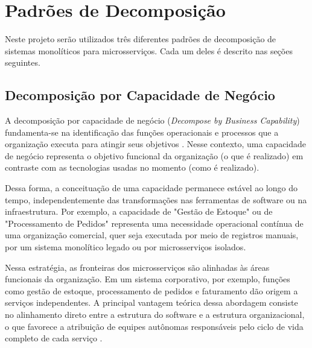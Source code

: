
\section{Padrões de Decomposição}

Neste projeto serão utilizados três diferentes padrões de decomposição de sistemas monolíticos para microsserviços. Cada um deles é descrito nas seções seguintes.


\subsection{Decomposição por Capacidade de Negócio}

A decomposição por capacidade de negócio (\textit{Decompose by Business Capability}) fundamenta-se na identificação das funções operacionais e processos que a organização executa para atingir seus objetivos \cite{richardson2018}. Nesse contexto, uma capacidade de negócio representa o objetivo funcional da organização (o que é realizado) em contraste com as tecnologias usadas no momento (como é realizado).

Dessa forma, a conceituação de uma capacidade permanece estável ao longo do tempo, independentemente das transformações nas ferramentas de software ou na infraestrutura. Por exemplo, a capacidade de "Gestão de Estoque" ou de "Processamento de Pedidos" representa uma necessidade operacional contínua de uma organização comercial, quer seja executada por meio de registros manuais, por um sistema monolítico legado ou por microsserviços isolados.

Nessa estratégia, as fronteiras dos microsserviços são alinhadas às áreas funcionais da organização. Em um sistema corporativo, por exemplo, funções como gestão de estoque, processamento de pedidos e faturamento dão origem a serviços independentes. A principal vantagem teórica dessa abordagem consiste no alinhamento direto entre a estrutura do software e a estrutura organizacional, o que favorece a atribuição de equipes autônomas responsáveis pelo ciclo de vida completo de cada serviço \cite{newman2021}.

